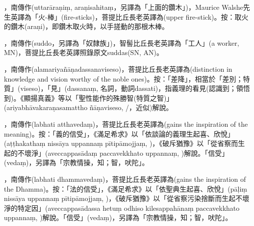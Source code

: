 \startitemgroup[noteitems]
\item{}，南傳作(uttarāraṇiṃ, araṇisahitaṃ，另譯為「上面的鑽木」)，Maurice Walshe先生英譯為「火-棒」(fire-sticks)，菩提比丘長老英譯為(upper fire-stick)。按：取火的鑽木(araṇi)，即鑽木取火時，以手搓動的那根木棒。
\stopitemgroup

\startitemgroup[noteitems]
\item{}，南傳作(suddo，另譯為「奴隸族」)，智髻比丘長老英譯為「工人」(a worker, MN)，菩提比丘長老英譯照錄原文suddas(SN, AN)。
\stopitemgroup

\startitemgroup[noteitems]
\item{}，南傳作(alamariyañāṇadassanaviseso)，菩提比丘長老英譯為(distinction in knowledge and vision worthy of the noble ones)。按：「差降」，相當於「差別；特質」(viseso)，「見」(dassanaṃ, 名詞，動詞dassati)，指義理的看見(認識到；領悟到)。《顯揚真義》等以「聖性能作的殊勝智(特質之智)」(ariyabhāvakaraṇasamattho ñāṇaviseso, /，近似)解說。
\stopitemgroup

\startitemgroup[noteitems]
\item{}，南傳作(labhati atthavedaṃ)，菩提比丘長老英譯為(gains the inspiration of the meaning)。按：「義的信受」，《滿足希求》以「依談論的義理生起喜、欣悅」(aṭṭhakathaṃ nissāya uppannaṃ pītipāmojjaṃ, )，《破斥猶豫》以「從省察而生起的不壞淨」(aveccappasādaṃ paccavekkhato uppannaṃ, )解說。「信受」(vedaṃ)，另譯為「宗教情操，知；智，吠陀」。
\stopitemgroup

\startitemgroup[noteitems]
\item{}，南傳作(labhati dhammavedaṃ)，菩提比丘長老英譯為(gains the inspiration of the Dhamma)。按：「法的信受」，《滿足希求》以「依聖典生起喜、欣悅」(pāḷiṃ nissāya uppannaṃ pītipāmojjaṃ, )，《破斥猶豫》以「從省察污染捨斷而生起不壞淨的特定因」(aveccappasādassa hetuṃ odhiso kilesappahānaṃ paccavekkhato uppannaṃ, )解說。「信受」(vedaṃ)，另譯為「宗教情操，知；智，吠陀」。
\stopitemgroup

